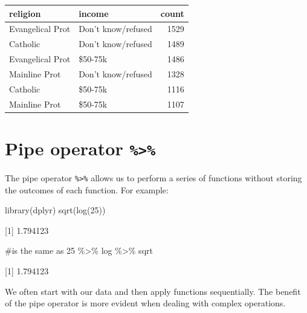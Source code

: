 \documentclass[
  letterpaper,
  DIV=11,
  numbers=noendperiod]{scrreprt}
\newenvironment{Shaded}{\begin{snugshade}}{\end{snugshade}}
\newcommand{\CommentTok}[1]{\textcolor[rgb]{0.37,0.37,0.37}{#1}}
\newcommand{\DecValTok}[1]{\textcolor[rgb]{0.68,0.00,0.00}{#1}}
\newcommand{\FunctionTok}[1]{\textcolor[rgb]{0.28,0.35,0.67}{#1}}
\newcommand{\NormalTok}[1]{\textcolor[rgb]{0.00,0.23,0.31}{#1}}
\newcommand{\SpecialCharTok}[1]{\textcolor[rgb]{0.37,0.37,0.37}{#1}}
\begin{document}
\begin{longtable}[]{@{}llr@{}}
\toprule\noalign{}
religion & income & count \\
\midrule\noalign{}
\endhead
\bottomrule\noalign{}
\endlastfoot
Evangelical Prot & Don't know/refused & 1529 \\
Catholic & Don't know/refused & 1489 \\
Evangelical Prot & \$50-75k & 1486 \\
Mainline Prot & Don't know/refused & 1328 \\
Catholic & \$50-75k & 1116 \\
Mainline Prot & \$50-75k & 1107 \\
\end{longtable}

\hypertarget{pipe-operator}{%
\section*{\texorpdfstring{Pipe operator
\texttt{\%\textgreater{}\%}}{Pipe operator \%\textgreater\%}}\label{pipe-operator}}


The pipe operator \texttt{\%\textgreater{}\%} allows us to perform a
series of functions without storing the outcomes of each function. For
example:

\begin{Shaded}
\begin{Highlighting}[]
\FunctionTok{library}\NormalTok{(dplyr)}
\FunctionTok{sqrt}\NormalTok{(}\FunctionTok{log}\NormalTok{(}\DecValTok{25}\NormalTok{))}
\end{Highlighting}
\end{Shaded}

{[}1{]} 1.794123

\begin{Shaded}
\begin{Highlighting}[]
\CommentTok{\#is the same as}
\DecValTok{25} \SpecialCharTok{\%\textgreater{}\%} 
\NormalTok{  log }\SpecialCharTok{\%\textgreater{}\%} 
\NormalTok{  sqrt}
\end{Highlighting}
\end{Shaded}

{[}1{]} 1.794123

We often start with our data and then apply functions sequentially. The
benefit of the pipe operator is more evident when dealing with complex
operations.
\end{document}

